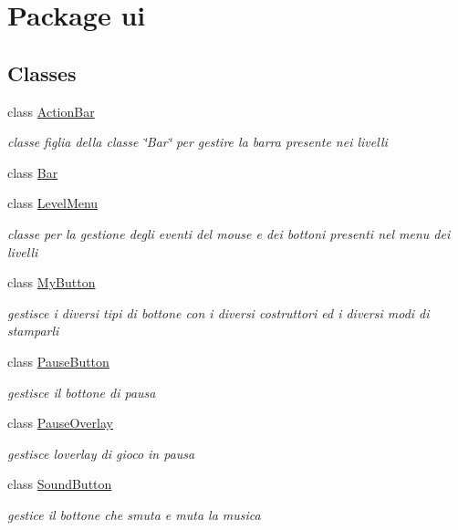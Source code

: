 \hypertarget{namespaceui}{}\section{Package ui}
\label{namespaceui}
\subsection*{Classes}
\begin{DoxyCompactItemize}
\item 
class \hyperlink{classui_1_1_action_bar}{Action\+Bar}
\begin{DoxyCompactList}\small\item\em classe figlia della classe \char`\"{}\+Bar\char`\"{} per gestire la barra presente nei livelli \end{DoxyCompactList}\item 
class \hyperlink{classui_1_1_bar}{Bar}
\item 
class \hyperlink{classui_1_1_level_menu}{Level\+Menu}
\begin{DoxyCompactList}\small\item\em classe per la gestione degli eventi del mouse e dei bottoni presenti nel menu dei livelli \end{DoxyCompactList}\item 
class \hyperlink{classui_1_1_my_button}{My\+Button}
\begin{DoxyCompactList}\small\item\em gestisce i diversi tipi di bottone con i diversi costruttori ed i diversi modi di stamparli \end{DoxyCompactList}\item 
class \hyperlink{classui_1_1_pause_button}{Pause\+Button}
\begin{DoxyCompactList}\small\item\em gestisce il bottone di pausa \end{DoxyCompactList}\item 
class \hyperlink{classui_1_1_pause_overlay}{Pause\+Overlay}
\begin{DoxyCompactList}\small\item\em gestisce l\textquotesingle{}overlay di gioco in pausa \end{DoxyCompactList}\item 
class \hyperlink{classui_1_1_sound_button}{Sound\+Button}
\begin{DoxyCompactList}\small\item\em gestice il bottone che smuta e muta la musica \end{DoxyCompactList}\item 

\end{DoxyCompactItemize}
